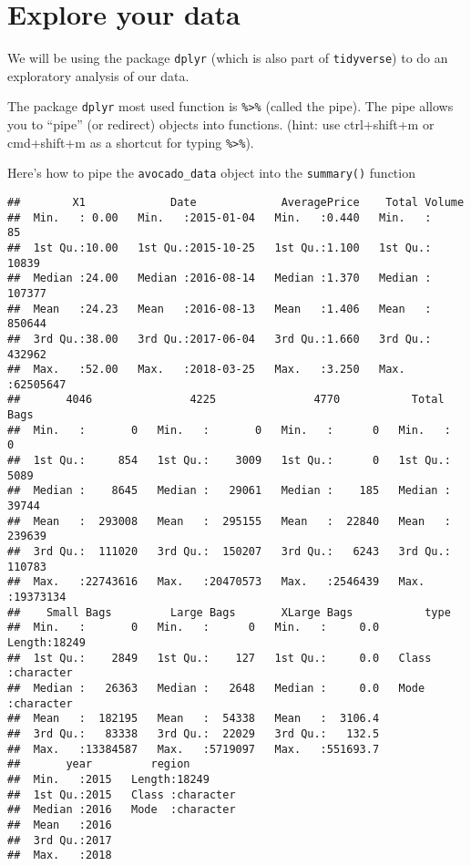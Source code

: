 \documentclass[]{book}
\newenvironment{Shaded}{\begin{snugshade}}{\end{snugshade}}
\newcommand{\CommentTok}[1]{\textcolor[rgb]{0.56,0.35,0.01}{\textit{#1}}}
\newcommand{\KeywordTok}[1]{\textcolor[rgb]{0.13,0.29,0.53}{\textbf{#1}}}
\newcommand{\NormalTok}[1]{#1}
\newcommand{\OperatorTok}[1]{\textcolor[rgb]{0.81,0.36,0.00}{\textbf{#1}}}
\newcommand{\StringTok}[1]{\textcolor[rgb]{0.31,0.60,0.02}{#1}}
\begin{document}
\hypertarget{explore-your-data}{%
\section{Explore your data}\label{explore-your-data}}

We will be using the package \texttt{dplyr} (which is also part of \texttt{tidyverse}) to do an exploratory analysis of our data.

The package \texttt{dplyr} most used function is \texttt{\%\textgreater{}\%} (called the pipe). The pipe allows you to ``pipe'' (or redirect) objects into functions. (hint: use ctrl+shift+m or cmd+shift+m as a shortcut for typing \texttt{\%\textgreater{}\%}).

Here's how to pipe the \texttt{avocado\_data} object into the \texttt{summary()} function

\begin{Shaded}
\end{Shaded}

\begin{verbatim}
##        X1             Date             AveragePrice    Total Volume     
##  Min.   : 0.00   Min.   :2015-01-04   Min.   :0.440   Min.   :      85  
##  1st Qu.:10.00   1st Qu.:2015-10-25   1st Qu.:1.100   1st Qu.:   10839  
##  Median :24.00   Median :2016-08-14   Median :1.370   Median :  107377  
##  Mean   :24.23   Mean   :2016-08-13   Mean   :1.406   Mean   :  850644  
##  3rd Qu.:38.00   3rd Qu.:2017-06-04   3rd Qu.:1.660   3rd Qu.:  432962  
##  Max.   :52.00   Max.   :2018-03-25   Max.   :3.250   Max.   :62505647  
##       4046               4225               4770           Total Bags      
##  Min.   :       0   Min.   :       0   Min.   :      0   Min.   :       0  
##  1st Qu.:     854   1st Qu.:    3009   1st Qu.:      0   1st Qu.:    5089  
##  Median :    8645   Median :   29061   Median :    185   Median :   39744  
##  Mean   :  293008   Mean   :  295155   Mean   :  22840   Mean   :  239639  
##  3rd Qu.:  111020   3rd Qu.:  150207   3rd Qu.:   6243   3rd Qu.:  110783  
##  Max.   :22743616   Max.   :20470573   Max.   :2546439   Max.   :19373134  
##    Small Bags         Large Bags       XLarge Bags           type          
##  Min.   :       0   Min.   :      0   Min.   :     0.0   Length:18249      
##  1st Qu.:    2849   1st Qu.:    127   1st Qu.:     0.0   Class :character  
##  Median :   26363   Median :   2648   Median :     0.0   Mode  :character  
##  Mean   :  182195   Mean   :  54338   Mean   :  3106.4                     
##  3rd Qu.:   83338   3rd Qu.:  22029   3rd Qu.:   132.5                     
##  Max.   :13384587   Max.   :5719097   Max.   :551693.7                     
##       year         region         
##  Min.   :2015   Length:18249      
##  1st Qu.:2015   Class :character  
##  Median :2016   Mode  :character  
##  Mean   :2016                     
##  3rd Qu.:2017                     
##  Max.   :2018
\end{verbatim}
\end{document}
